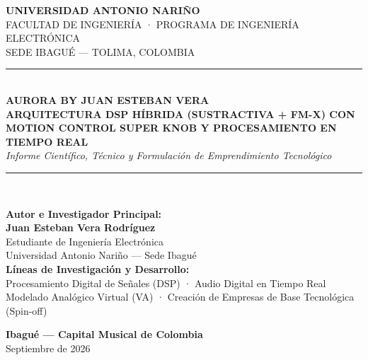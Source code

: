 \documentclass[11pt,a4paper]{article}
\begin{document}
\begin{titlepage}
    \centering
    \vspace*{0.5cm}
    
    {\scshape\Large \textbf{UNIVERSIDAD ANTONIO NARIÑO}}\\[0.25cm]
    {\scshape\large FACULTAD DE INGENIERÍA · PROGRAMA DE INGENIERÍA ELECTRÓNICA}\\[0.15cm]
    {\small SEDE IBAGUÉ — TOLIMA, COLOMBIA}\\[1.5cm]
    
    \rule{\linewidth}{1.5pt}\\[0.4cm]
    {\huge \bfseries \textcolor{uanblue}{AURORA BY JUAN ESTEBAN VERA}}\\[0.3cm]
    {\Large \bfseries ARQUITECTURA DSP HÍBRIDA (SUSTRACTIVA + FM-X) CON MOTION CONTROL SUPER KNOB Y PROCESAMIENTO EN TIEMPO REAL}\\[0.2cm]
    {\large \itshape Informe Científico, Técnico y Formulación de Emprendimiento Tecnológico}\\[0.4cm]
    \rule{\linewidth}{1.5pt}\\[2.0cm]
    
    \begin{minipage}{0.85\textwidth}
        \centering
        \textbf{Autor e Investigador Principal:}\\
        {\large \textbf{Juan Esteban Vera Rodríguez}}\\[0.15cm]
        {\small Estudiante de Ingeniería Electrónica}\\
        {\small Universidad Antonio Nariño — Sede Ibagué}\\[1.0cm]
        
        \textbf{Líneas de Investigación y Desarrollo:}\\
        {\small Procesamiento Digital de Señales (DSP) · Audio Digital en Tiempo Real}\\
        {\small Modelado Analógico Virtual (VA) · Creación de Empresas de Base Tecnológica (Spin-off)}
    \end{minipage}
    
    \vfill
    {\large \textbf{Ibagué — Capital Musical de Colombia}}\\
    {\small Septiembre de 2026}
\end{titlepage}

\newpage
\thispagestyle{plain}
\vspace*{1.5cm}
\end{document}
